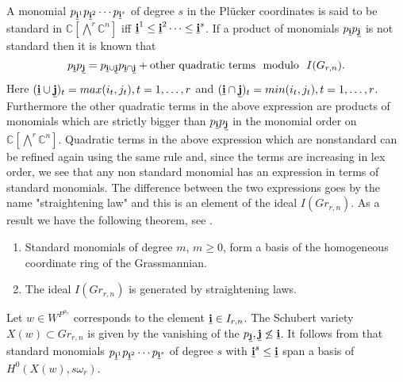  A monomial $p_{{\bf \underline{i}}^1} p_{{\bf \underline{i}}^2} \cdots p_{{\bf \underline{i}}^s}$ of degree $s$ in the Pl\"{u}cker coordinates is said to be standard in ${\mathbb C}[\bigwedge^r {\mathbb C}^n]$ iff 
 ${\bf \underline{i}}^1 \leq {\bf \underline{i}}^2 \cdots \leq {\bf \underline{i}}^s$.  If a product of monomials $p_{\bf \underline{i}} p_{\bf \underline{j}}$ is not standard then it is known that 
 \[ p_{\bf \underline{i}} p_{\bf \underline{j}} = p_{\bf \underline{i} \cup \bf \underline{j}}p_{\bf \underline{i} \cap \bf \underline{j}} + \text{other quadratic terms\ \ } \text{modulo\ \ }  I(G_{r,n}). \]
 Here $({\bf \underline{i} \cup \bf \underline{j}})_t = max(i_t, j_t), t = 1,\ldots,r$ and  $({\bf \underline{i} \cap \bf \underline{j}})_t = min (i_t, j_t), t = 1,\ldots,r$. 
 Furthermore the other quadratic terms in the above expression are products of monomials which are strictly bigger than $p_{\bf \underline{i}} p_{\bf \underline{j}}$ in the monomial order on ${\mathbb C}[\bigwedge^r {\mathbb C}^n]$. Quadratic terms in the above expression which are nonstandard can be refined again using the same rule and, since the terms are increasing in lex order, we see that any non standard monomial has an expression in terms of standard monomials. The difference between the two expressions goes by the name "straightening law" and this is an element of the ideal $I(Gr_{r,n})$. As a result we have the following theorem, see \cite[Proposition 1.3.6]{seshadriintroduction}.
 
 \begin{theorem} 

\noindent
\begin{enumerate}
 \item Standard monomials of degree $m$, $m \geq 0$, form a basis of the homogeneous coordinate ring of the Grassmannian.
 \item The ideal $I(Gr_{r,n})$ is generated by straightening laws.
 \end{enumerate}
\end{theorem}

Let $w \in W^{P^{\alpha_r}}$ corresponds to the element ${\bf \underline{i}}  \in I_{r,n}$. The Schubert variety $X(w) \subset Gr_{r,n}$ is given by the vanishing of the $p_{\bf \underline{j}}, {\bf \underline{j}} \not \leq  {\bf \underline{i}}$. It follows from \cite[Proposition 1.4.5]{seshadriintroduction} that standard monomials $p_{{\bf \underline{i}}^1} p_{{\bf \underline{i}}^2} \cdots p_{{\bf \underline{i}}^s}$ of degree $s$ with ${\bf \underline{i}}^s \leq {\bf \underline{i}}$ span a basis of $H^0(X(w), s \omega_r)$.


